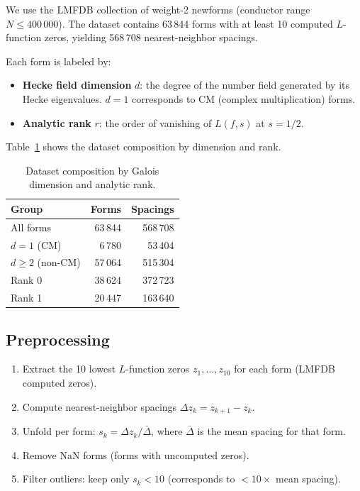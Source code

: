 \documentclass[11pt]{article}
\begin{document}
We use the LMFDB \cite{lmfdb} collection of weight-2 newforms
(conductor range $N \leq 400\,000$).  The dataset contains
63\,844 forms with at least 10 computed $L$-function zeros,
yielding 568\,708 nearest-neighbor spacings.

Each form is labeled by:
\begin{itemize}
  \item \textbf{Hecke field dimension} $d$: the degree of the number
    field generated by its Hecke eigenvalues.  $d=1$ corresponds to
    CM (complex multiplication) forms.
  \item \textbf{Analytic rank} $r$: the order of vanishing of
    $L(f,s)$ at $s=1/2$.
\end{itemize}
Table~\ref{tab:composition} shows the dataset composition by
dimension and rank.

\begin{table}[ht]
\centering
\caption{Dataset composition by Galois dimension and analytic rank.}
\label{tab:composition}
\begin{tabular}{lrr}
\toprule
Group & Forms & Spacings \\
\midrule
All forms & 63\,844 & 568\,708 \\
$d=1$ (CM) & \phantom{0}6\,780 & \phantom{0}53\,404 \\
$d\ge2$ (non-CM) & 57\,064 & 515\,304 \\
Rank 0 & 38\,624 & 372\,723 \\
Rank 1 & 20\,447 & 163\,640 \\
\bottomrule
\end{tabular}
\end{table}

\subsection{Preprocessing}

\begin{enumerate}
  \item Extract the 10 lowest $L$-function zeros $z_1,\ldots,z_{10}$
    for each form (LMFDB computed zeros).
  \item Compute nearest-neighbor spacings $\Delta z_k = z_{k+1} - z_k$.
  \item Unfold per form: $s_k = \Delta z_k / \bar{\Delta}$, where
    $\bar{\Delta}$ is the mean spacing for that form.
  \item Remove NaN forms (forms with uncomputed zeros).
  \item Filter outliers: keep only $s_k < 10$ (corresponds to
    $<10\times$ mean spacing).
\end{enumerate}
\end{document}
